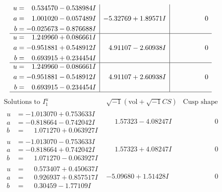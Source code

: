 \documentclass[1p]{elsarticle_modified}
\theoremstyle{definition}
\newcommand{\I}{\sqrt{-1}}
\begin{document}
$$\begin{array}{c|c|c}
\begin{aligned}
u &= \phantom{-}0.534570 - 0.538984 I \\
a &= \phantom{-}1.001020 - 0.057489 I \\
b &= -0.025673 - 0.876688 I\end{aligned}
 & -5.32769 + 1.89571 I & \phantom{-0.000000 } 0 \\ \hline\begin{aligned}
u &= \phantom{-}1.249960 + 0.086661 I \\
a &= -0.951881 + 0.548912 I \\
b &= \phantom{-}0.693915 + 0.234454 I\end{aligned}
 & \phantom{-}4.91107 - 2.60938 I & \phantom{-0.000000 } 0 \\ \hline\begin{aligned}
u &= \phantom{-}1.249960 - 0.086661 I \\
a &= -0.951881 - 0.548912 I \\
b &= \phantom{-}0.693915 - 0.234454 I\end{aligned}
 & \phantom{-}4.91107 + 2.60938 I & \phantom{-0.000000 } 0\\
 \hline 
 \end{array}$$\newpage$$\begin{array}{c|c|c}  
\text{Solutions to }I^u_{1}& \I (\text{vol} + \sqrt{-1}CS) & \text{Cusp shape}\\
 \hline 
\begin{aligned}
u &= -1.013070 + 0.753633 I \\
a &= -0.818664 - 0.742042 I \\
b &= \phantom{-}1.071270 + 0.063927 I\end{aligned}
 & \phantom{-}1.57323 - 4.08247 I & \phantom{-0.000000 } 0 \\ \hline\begin{aligned}
u &= -1.013070 - 0.753633 I \\
a &= -0.818664 + 0.742042 I \\
b &= \phantom{-}1.071270 - 0.063927 I\end{aligned}
 & \phantom{-}1.57323 + 4.08247 I & \phantom{-0.000000 } 0 \\ \hline\begin{aligned}
u &= \phantom{-}0.573407 + 0.450637 I \\
a &= \phantom{-}0.926937 + 0.857517 I \\
b &= \phantom{-}0.30459 - 1.77109 I\end{aligned}
 & -5.09680 + 1.51428 I & \phantom{-0.000000 } 0 \\ \hline\begin{aligned}

\end{aligned}
\end{array}$$
\end{document}
